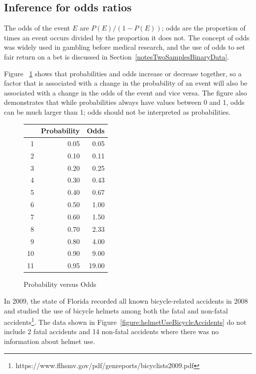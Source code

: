 \subsection{Inference for odds ratios}
\label{InferenceOddsRatios}

The odds of the event $E$ are $P(E)/(1 - P(E))$; odds are the proportion of times an event occurs divided by the proportion it does not.  The concept of odds was widely used in gambling before medical research, and the use of odds to set fair return on a bet is discussed in Section~\ref{notesTwoSamplesBinaryData}.

Figure ~\ref{figure:probVsOdds} shows that probabilities and odds increase or decrease together, so a factor that is associated with a change in the probability of an event will also be associated with a change in the odds of the event and vice versa.  The figure also demonstrates that while probabilities always have values between 0 and 1, odds can be much larger than 1; odds should not be interpreted as probabilities.

\begin{figure}[ht]
\centering
\begin{tabular}{rrr}
  \hline
 & Probability & Odds \\ 
  \hline
1 & 0.05 & 0.05 \\ 
  2 & 0.10 & 0.11 \\ 
  3 & 0.20 & 0.25 \\ 
  4 & 0.30 & 0.43 \\ 
  5 & 0.40 & 0.67 \\ 
  6 & 0.50 & 1.00 \\ 
  7 & 0.60 & 1.50 \\ 
  8 & 0.70 & 2.33 \\ 
  9 & 0.80 & 4.00 \\ 
  10 & 0.90 & 9.00 \\ 
  11 & 0.95 & 19.00 \\ 
   \hline
\end{tabular}
\caption{Probability versus Odds} 
\label{figure:probVsOdds}
\end{figure}

In 2009, the state of Florida recorded all known bicycle-related accidents in 2008 and studied the use of bicycle helmets among both the fatal and non-fatal accidents\footnote{https://www.flhsmv.gov/pdf/genreports/bicyclists2009.pdf}.  The data shown in Figure~\ref{figure:helmetUseBicycleAccidents} do not include 2 fatal accidents and 14 non-fatal accidents where there was no information about helmet use.

